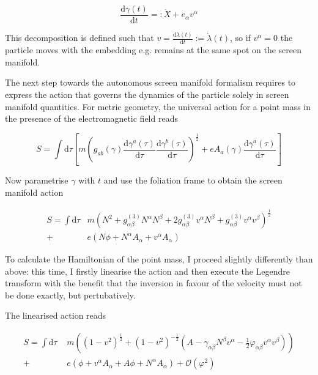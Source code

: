 \documentclass[11pt]{article}
\begin{document}
\begin{equation}
	\frac{\mathrm{d} \gamma (t)}{\mathrm{d} t } =: \dot{X} +  e_\alpha v^\alpha
\end{equation}

This decomposition is defined such that $v = 	\frac{\mathrm{d} \lambda (t)}{\mathrm{d} t } := \dot{\lambda} (t) $, so if $ v^\alpha = 0 $ the particle  moves with the embedding e.g. remains at the same spot on the screen manifold.

The next step towards the autonomous screen manifold formalism requires to express the action that governs the dynamics of the particle solely in screen manifold quantities. For metric geometry, the universal action for a point mass in the presence of the electromagnetic field reads

\begin{equation}
	S = \int \mathrm{d}\tau  \left[
	m \left( 
	g_{a b}\left( \gamma \right)
	\frac{\mathrm{d} \gamma^a\left( \tau \right) }{\mathrm{d}\tau}
	\frac{\mathrm{d} \gamma^b\left( \tau \right) }{\mathrm{d}\tau} \right)^{\frac{1}{2}}
	+ e A_a \left( \gamma  \right) 
	\frac{\mathrm{d} \gamma^a\left( \tau \right) }{\mathrm{d}\tau} 
	\right]
\end{equation}

Now parametrise $\gamma$ with $t$ and use the foliation frame to obtain the screen manifold action

\begin{equation}
\begin{split}
	S = \int \mathrm{d}\tau
	& m \left( 
	N^2 + g^{(3)}_{\alpha \beta} N^{\alpha} N^{\beta}
	+ 2 g^{(3)}_{\alpha \beta} v^\alpha N^\beta + g^{(3)}_{\alpha \beta} v^\alpha v^\beta 
	\right)^{\frac{1}{2}} \\
	+ \, & e \left( N \phi + N^\alpha A_\alpha + v^\alpha A_\alpha \right)
\end{split}
\end{equation}

To calculate the Hamiltonian of the point mass, I proceed slightly differently than above: this time, I firstly linearise the action and then execute the Legendre transform with the benefit that the inversion in favour of the velocity must not be done exactly, but pertubatively.

The linearised action reads

\begin{equation}
\begin{split}
	S = \int \mathrm{d}\tau  \, \, 
	& m \left(
	\left( 1 - v^2 \right)^{\frac{1}{2}}
	+ \left( 1 - v^2 \right)^{- \frac{1}{2}}
	\left( A - \gamma_{\alpha \beta} N^\beta v^\alpha - \frac{1}{2} \varphi_{\alpha \beta} v^\alpha v^\beta \right)
	\right)\\
	+ \, \, & e \left( \phi + v^\alpha A_\alpha + A \phi + N^\alpha A_\alpha \right) + \mathcal{O} \left(\varphi^2 \right)
\end{split}
\end{equation}
\end{document}
